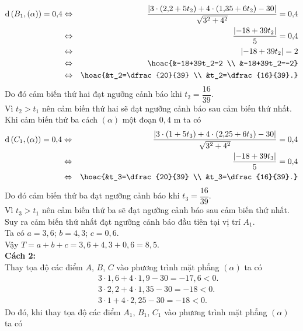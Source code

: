 \begin{ex}
{		\begin{eqnarray*}
			\mathrm{d}\left(B_1,(\alpha)\right)=0{,}4 &\Leftrightarrow& \dfrac{\left|3 \cdot (2{,}2+5t_2)+4 \cdot (1{,}35+6t_2)-30\right|}{\sqrt{3^2+4^2}}=0{,}4 \\
			&\Leftrightarrow& \dfrac{\left|-18+39t_2\right|}{5}=0{,}4 \\
			&\Leftrightarrow& \left|-18+39t_2\right|=2 \\
			&\Leftrightarrow& \hoac{&-18+39t_2=2 \\ &-18+39t_2=-2} \\
			&\Leftrightarrow& \hoac{&t_2=\dfrac{20}{39} \\ &t_2=\dfrac{16}{39}.}
		\end{eqnarray*}
		Do đó cảm biến thứ hai đạt ngưỡng cảnh báo khi $t_2=\dfrac{16}{39}$. \\ 
		Vì $t_2>t_1$ nên cảm biến thứ hai sẽ đạt ngưỡng cảnh báo sau cảm biến thứ nhất. \\
		Khi cảm biến thứ ba cách $(\alpha)$ một đoạn $0{,}4$ m ta có 
		\begin{eqnarray*}
			\mathrm{d}\left(C_1,(\alpha)\right)=0{,}4 &\Leftrightarrow& \dfrac{\left|3 \cdot (1+5t_3)+4 \cdot (2{,}25+6t_3)-30\right|}{\sqrt{3^2+4^2}}=0{,}4 \\
			&\Leftrightarrow& \dfrac{\left|-18+39t_3\right|}{5}=0{,}4 \\
			&\Leftrightarrow& \hoac{&t_3=\dfrac{20}{39} \\ &t_3=\dfrac{16}{39}.}
		\end{eqnarray*}
		Do đó cảm biến thứ ba đạt ngưỡng cảnh báo khi $t_3=\dfrac{16}{39}$. \\ 
		Vì $t_3>t_1$ nên cảm biến thứ ba sẽ đạt ngưỡng cảnh báo sau cảm biến thứ nhất. \\
		Suy ra cảm biến thứ nhất đạt ngưỡng cảnh báo đầu tiên tại vị trí $A_1$. \\
		Ta có $a=3{,}6$; $b=4{,}3$; $c=0{,}6$. \\
		Vậy $T=a+b+c=3{,6}+4{,}3+0{,}6=8{,}5$. \\
		\textbf{Cách 2:} \\
		Thay tọa độ các điểm $A$, $B$, $C$ vào phương trình mặt phẳng $(\alpha)$ ta có 
		\begin{eqnarray*}
			&& 3 \cdot 1{,}6+4 \cdot 1{,}9-30=-17{,}6<0. \\
			&& 3 \cdot 2{,}2+4 \cdot 1{,}35-30=-18<0. \\
			&& 3 \cdot 1+4 \cdot 2{,}25-30=-18<0.
		\end{eqnarray*}
		Do đó, khi thay tọa độ các điểm $A_1$, $B_1$, $C_1$ vào phương trình mặt phẳng $(\alpha)$ ta có
}
\end{ex}
